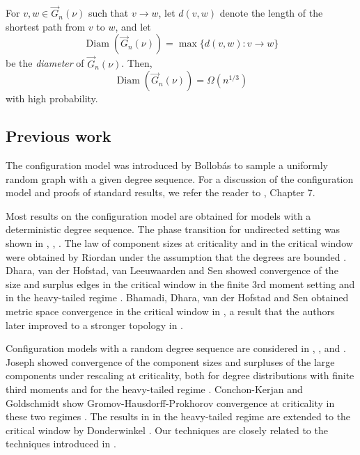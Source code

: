\begin{corollary}
For $v,w\in \vec{G}_n(\nu)$ such that $v\to w$, let $d(v,w)$ denote the length of the shortest path from $v$ to $w$, and let $$\operatorname{Diam}\left(\vec{G}_n(\nu)\right)=\max\{d(v,w):v\to w\}$$ be the \emph{diameter} of $\vec{G}_n(\nu)$. Then,  $$\operatorname{Diam}\left(\vec{G}_n(\nu)\right)=\Omega(n^{1/3})$$
with high probability.
\end{corollary}


\subsection{Previous work}
The configuration model was introduced by Bollobás \cite{Bollobas1980} to sample a uniformly random graph with a given degree sequence. For a discussion of the configuration model and proofs of standard results, we refer the reader to \cite{hofstadRandomGraphsComplex2017}, Chapter 7.   

Most results on the configuration model are obtained for models with a deterministic degree sequence. The phase transition for undirected setting was shown in \cite{molloyCriticalPointRandom1995}, \cite{Molloy1998}, \cite{Janson2009}. The law of component sizes at criticality and in the critical window were obtained by Riordan  under the assumption that the degrees are bounded \cite{Riordan2012}. Dhara, van der Hofstad, van Leeuwaarden and Sen showed convergence of the size and surplus edges in the critical window in the finite 3rd moment setting \cite{Dhara2017} and in the heavy-tailed regime \cite{Dhara2020}.  Bhamadi, Dhara, van der Hofstad and Sen obtained metric space convergence in the critical window in \cite{Bhamidi2020}, a result that the authors later improved to a stronger topology in \cite{Bhamidi2020Glmb}. 

Configuration models with a random degree sequence are considered in \cite{josephComponentSizesCritical2014}, \cite{conchon--kerjanStableGraphMetric2020}, and \cite{Donderwinkel2021heightprocess}. Joseph showed convergence of the component sizes and surpluses of the large components under rescaling at criticality, both for degree distributions with finite third moments and for the heavy-tailed regime \cite{josephComponentSizesCritical2014}. Conchon-Kerjan and Goldschmidt show Gromov-Hausdorff-Prokhorov convergence at criticality in these two regimes \cite{conchon--kerjanStableGraphMetric2020}. The results in \cite{conchon--kerjanStableGraphMetric2020} in the heavy-tailed regime are extended to the critical window by Donderwinkel \cite{Donderwinkel2021heightprocess}. Our techniques are closely related to the techniques introduced in \cite{conchon--kerjanStableGraphMetric2020}. 

